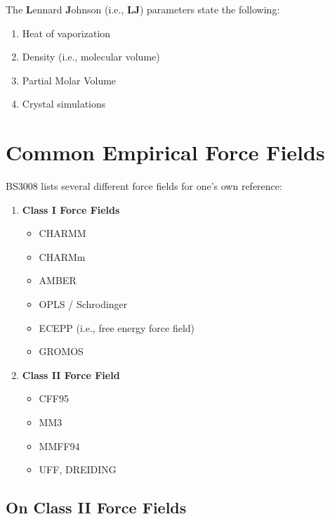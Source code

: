 \documentclass[
  letterpaper,
  DIV=11,
  numbers=noendperiod]{scrreprt}
\providecommand{\tightlist}{%
  \setlength{\itemsep}{0pt}\setlength{\parskip}{0pt}}\usepackage{longtable,booktabs,array}
\begin{document}
The \textbf{L}ennard \textbf{J}ohnson (i.e., \textbf{LJ}) parameters
state the following:

\begin{enumerate}
\def\labelenumi{\arabic{enumi}.}
\tightlist
\item
  Heat of vaporization
\item
  Density (i.e., molecular volume)
\item
  Partial Molar Volume
\item
  Crystal simulations
\end{enumerate}

\hypertarget{common-empirical-force-fields}{%
\section{Common Empirical Force
Fields}\label{common-empirical-force-fields}}

BS3008 lists several different force fields for one's own reference:

\begin{enumerate}
\def\labelenumi{\arabic{enumi}.}
\item
  \textbf{Class I Force Fields}

  \begin{itemize}
  \tightlist
  \item
    CHARMM
  \item
    CHARMm
  \item
    AMBER
  \item
    OPLS / Schrodinger
  \item
    ECEPP (i.e., free energy force field)
  \item
    GROMOS
  \end{itemize}
\item
  \textbf{Class II Force Field}

  \begin{itemize}
  \tightlist
  \item
    CFF95
  \item
    MM3
  \item
    MMFF94
  \item
    UFF, DREIDING
  \end{itemize}
\end{enumerate}

\hypertarget{on-class-ii-force-fields}{%
\subsection{On Class II Force Fields}\label{on-class-ii-force-fields}}
\end{document}
